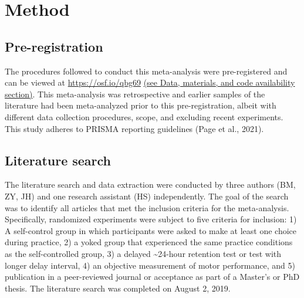 \documentclass[
  english,
  man, donotrepeattitle,floatsintext]{apa7}
\begin{document}
\hypertarget{method}{%
\section{Method}\label{method}}

\hypertarget{pre-registration}{%
\subsection{Pre-registration}\label{pre-registration}}

The procedures followed to conduct this meta-analysis were pre-registered and can be viewed at \url{https://osf.io/qbg69} \hyperref[sec:sharing]{(see Data, materials, and code availability section)}. This meta-analysis was retrospective and earlier samples of the literature had been meta-analyzed prior to this pre-registration, albeit with different data collection procedures, scope, and excluding recent experiments. This study adheres to PRISMA reporting guidelines (Page et al., 2021).

\hypertarget{literature-search}{%
\subsection{Literature search}\label{literature-search}}

The literature search and data extraction were conducted by three authors (BM, ZY, JH) and one research assistant (HS) independently. The goal of the search was to identify all articles that met the inclusion criteria for the meta-analysis. Specifically, randomized experiments were subject to five criteria for inclusion: 1) A self-control group in which participants were asked to make at least one choice during practice, 2) a yoked group that experienced the same practice conditions as the self-controlled group, 3) a delayed \textasciitilde24-hour retention test or test with longer delay interval, 4) an objective measurement of motor performance, and 5) publication in a peer-reviewed journal or acceptance as part of a Master's or PhD thesis. The literature search was completed on August 2, 2019.
\end{document}
